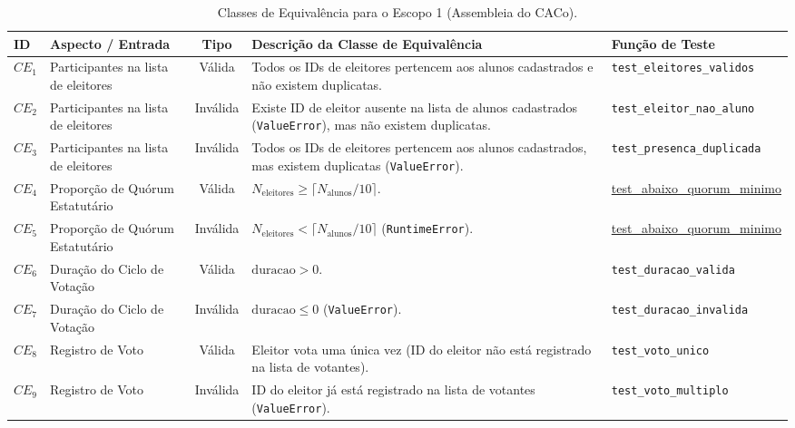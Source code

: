 \documentclass[12pt,a4paper]{article}
\begin{document}
\small
\begin{xltabular}{\textwidth}{|l|Y|c|Y|Y|}

\caption{Classes de Equivalência para o Escopo 1 (Assembleia do CACo).}
\label{tab:escopo1} \\

\hline
{}
\textbf{ID} & \textbf{Aspecto / Entrada} & \textbf{Tipo} &
\textbf{Descrição da Classe de Equivalência} &
\textbf{Função de Teste} \\ \hline

$CE_1$ & Participantes na lista de eleitores & Válida &
Todos os IDs de eleitores pertencem aos alunos cadastrados e não existem duplicatas. &
\texttt{test\_eleitores\_validos} \\ \hline

$CE_2$ & Participantes na lista de eleitores & Inválida &
Existe ID de eleitor ausente na lista de alunos cadastrados (\texttt{ValueError}), mas não existem duplicatas. &
\texttt{test\_eleitor\_nao\_aluno} \\ \hline

$CE_3$ & Participantes na lista de eleitores & Inválida &
Todos os IDs de eleitores pertencem aos alunos cadastrados, mas existem duplicatas (\texttt{ValueError}). &
\texttt{test\_presenca\_duplicada} \\ \hline

$CE_4$ & Proporção de Quórum Estatutário & Válida &
$N_{\text{eleitores}} \geq \lceil N_{\text{alunos}} / 10 \rceil$. &
\url{test_abaixo_quorum_minimo} \\ \hline

$CE_5$ & Proporção de Quórum Estatutário & Inválida &
$N_{\text{eleitores}} < \lceil N_{\text{alunos}} / 10 \rceil$ (\texttt{RuntimeError}). &
\url{test_abaixo_quorum_minimo} \\ \hline

$CE_6$ & Duração do Ciclo de Votação & Válida &
$\text{duracao} > 0$. &
\texttt{test\_duracao\_valida} \\ \hline

$CE_7$ & Duração do Ciclo de Votação & Inválida &
$\text{duracao} \leq 0$ (\texttt{ValueError}). &
\texttt{test\_duracao\_invalida} \\ \hline

$CE_8$ & Registro de Voto & Válida &
Eleitor vota uma única vez (ID do eleitor não está registrado na lista de votantes). &
\texttt{test\_voto\_unico} \\ \hline

$CE_9$ & Registro de Voto & Inválida &
ID do eleitor já está registrado na lista de votantes (\texttt{ValueError}). &
\texttt{test\_voto\_multiplo} \\ \hline


\end{xltabular}
\end{document}

